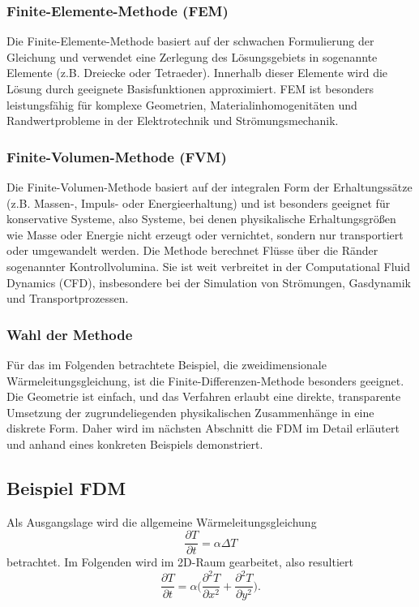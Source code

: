 \subsubsection{Finite-Elemente-Methode (FEM)}

Die Finite-Elemente-Methode basiert auf der schwachen Formulierung der Gleichung und verwendet eine Zerlegung des Lösungsgebiets in sogenannte Elemente (z.B. Dreiecke oder Tetraeder).
Innerhalb dieser Elemente wird die Lösung durch geeignete Basisfunktionen approximiert.
FEM ist besonders leistungsfähig für komplexe Geometrien, Materialinhomogenitäten und Randwertprobleme in der Elektrotechnik und Strömungsmechanik.

\subsubsection{Finite-Volumen-Methode (FVM)}

Die Finite-Volumen-Methode basiert auf der integralen Form der Erhaltungssätze (z.B. Massen-, Impuls- oder Energieerhaltung) und ist besonders geeignet für konservative Systeme, also Systeme, bei denen physikalische Erhaltungsgrößen wie Masse oder Energie nicht erzeugt oder vernichtet, sondern nur transportiert oder umgewandelt werden.
Die Methode berechnet Flüsse über die Ränder sogenannter Kontrollvolumina.
Sie ist weit verbreitet in der Computational Fluid Dynamics (CFD), insbesondere bei der Simulation von Strömungen, Gasdynamik und Transportprozessen.

\subsubsection{Wahl der Methode}

Für das im Folgenden betrachtete Beispiel, die zweidimensionale Wärmeleitungsgleichung, ist die Finite-Differenzen-Methode besonders geeignet.
Die Geometrie ist einfach, und das Verfahren erlaubt eine direkte, transparente Umsetzung der zugrundeliegenden physikalischen Zusammenhänge in eine diskrete Form.
Daher wird im nächsten Abschnitt die FDM im Detail erläutert und anhand eines konkreten Beispiels demonstriert.

\subsection{Beispiel FDM}

Als Ausgangslage wird die allgemeine Wärmeleitungsgleichung
\begin{equation}
	\frac{\partial T}{\partial t}
	=
	\alpha \Delta T
	\label{parallelisierung:eq:Wärmeleitung_alg}
\end{equation}
betrachtet.
Im Folgenden wird im 2D-Raum gearbeitet, also resultiert
\begin{equation}
	\frac{\partial T}{\partial t}
	=
	\alpha \biggl(
	\frac{\partial^2 T}{\partial x^2}
	+
	\frac{\partial^2 T}{\partial y^2}
	\biggr).
	\label{parallelisierung:eq:Wärmeleitung_2D}
\end{equation}


